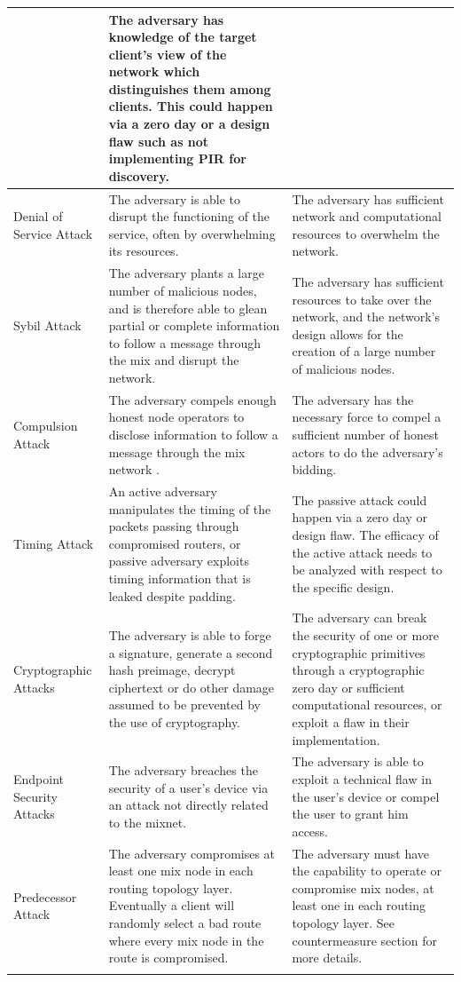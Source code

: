 \documentclass{article}
\begin{document}
\begin{center}
\begin{tabularx}{\textwidth}[t]{|m{}| m{}| m{}| }
&  The adversary has knowledge of the target client's view of the network which distinguishes them among clients. This could happen via a zero day or a design flaw such as not implementing PIR for discovery. \\
\hline Denial of Service Attack & The adversary is able to disrupt the functioning of the service, often by overwhelming its resources. & The adversary has sufficient network and computational resources to overwhelm the network. \\
\hline Sybil Attack & The adversary plants a large number of malicious nodes, and is therefore able to glean partial or complete information to follow a message through the mix and disrupt the network. & The adversary has sufficient resources to take over the network, and the network's design allows for the creation of a large number of malicious nodes.\\
\hline Compulsion Attack & The adversary compels enough honest node operators to disclose information to follow a message through the mix network . & The adversary has the necessary force to compel a sufficient number of honest actors to do the adversary's bidding. \\
\hline Timing Attack & An active adversary manipulates the timing of the packets passing through compromised routers, or passive adversary exploits timing information that is leaked despite padding. & 
The passive attack could happen via a zero day or design flaw. The efficacy of the active attack needs to be analyzed with respect to the specific design.\smallskip

\\
\hline Cryptographic Attacks & The adversary is able to forge a signature, generate a second hash preimage, decrypt ciphertext or do other damage assumed to be prevented by the use of cryptography. & The adversary can break the security of one or more cryptographic primitives through a cryptographic zero day or sufficient computational resources, or exploit a flaw in their implementation.  \\


\hline Endpoint Security Attacks & The adversary breaches the security of a user's device via an attack not directly related to the mixnet. & The adversary is able to exploit a technical flaw in the user's device or compel the user to grant him access.\\

\hline Predecessor Attack & The adversary compromises at least one  mix node in each routing topology layer. Eventually a client will randomly select a bad route where every mix node in the route is compromised. & The adversary must have the capability to operate or compromise mix nodes, at least one in each routing topology layer. See countermeasure section for more details.
\\


\arrayrulecolor{blue}
\hline
\end{tabularx}
\end{center}
\pagebreak
\end{document}
